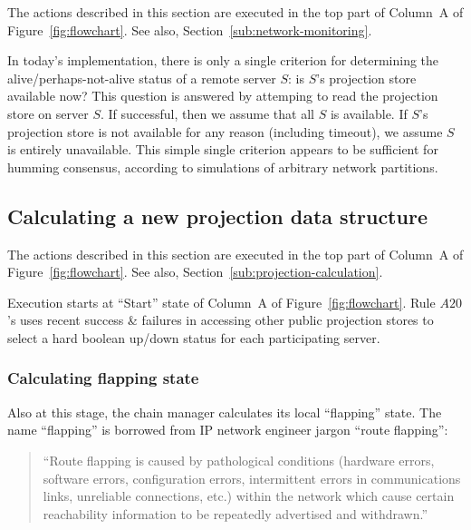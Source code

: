 \documentclass[preprint,10pt]{sigplanconf}
\begin{document}
The actions described in this section are executed in the top part of
Column~A of Figure~\ref{fig:flowchart}.
See also, Section~\ref{sub:network-monitoring}.

In today's implementation, there is only a single criterion for
determining the alive/perhaps-not-alive status of a remote server $S$:
is $S$'s projection store available now?  This question is answered by
attemping to read the projection store on server $S$.  
If successful, then we assume that all
$S$ is available.  If $S$'s projection store is not available for any
reason (including timeout), we assume $S$ is entirely unavailable.
This simple single
criterion appears to be sufficient for humming consensus, according to
simulations of arbitrary network partitions.


\subsection{Calculating a new projection data structure}
\label{sub:humming-projection-calculation}

The actions described in this section are executed in the top part of
Column~A of Figure~\ref{fig:flowchart}.
See also, Section~\ref{sub:projection-calculation}.

Execution starts at ``Start'' state of Column~A of
Figure~\ref{fig:flowchart}.  Rule $A20$'s uses recent success \&
failures in accessing other public projection stores to select a hard
boolean up/down status for each participating server.

\subsubsection{Calculating flapping state}

Also at this stage, the chain manager calculates its local
``flapping'' state.  The name ``flapping'' is borrowed from IP network
engineer jargon ``route flapping'':

\begin{quotation}
``Route flapping is caused by pathological conditions
(hardware errors, software errors, configuration errors, intermittent
errors in communications links, unreliable connections, etc.) within
the network which cause certain reachability information to be
repeatedly advertised and withdrawn.''  \cite{wikipedia-route-flapping}
\end{quotation}
\end{document}
